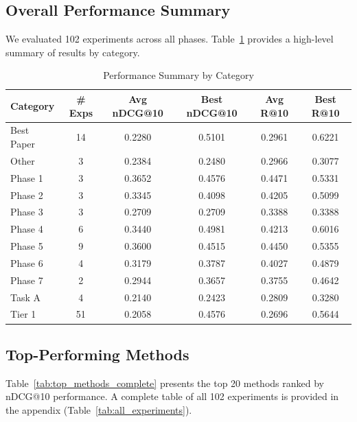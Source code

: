 \documentclass[11pt]{article}
\begin{document}
\subsection{Overall Performance Summary}

We evaluated 102 experiments across all phases. Table~\ref{tab:category_summary} provides a high-level summary of results by category.

\begin{table}[h]
\centering
\caption{Performance Summary by Category}
\label{tab:category_summary}
\small
\begin{tabular}{lccccc}
\toprule
\textbf{Category} & \textbf{\# Exps} & \textbf{Avg nDCG@10} & \textbf{Best nDCG@10} & \textbf{Avg R@10} & \textbf{Best R@10} \\
\midrule
Best Paper & 14 & 0.2280 & 0.5101 & 0.2961 & 0.6221 \\
Other & 3 & 0.2384 & 0.2480 & 0.2966 & 0.3077 \\
Phase 1 & 3 & 0.3652 & 0.4576 & 0.4471 & 0.5331 \\
Phase 2 & 3 & 0.3345 & 0.4098 & 0.4205 & 0.5099 \\
Phase 3 & 3 & 0.2709 & 0.2709 & 0.3388 & 0.3388 \\
Phase 4 & 6 & 0.3440 & 0.4981 & 0.4213 & 0.6016 \\
Phase 5 & 9 & 0.3600 & 0.4515 & 0.4450 & 0.5355 \\
Phase 6 & 4 & 0.3179 & 0.3787 & 0.4027 & 0.4879 \\
Phase 7 & 2 & 0.2944 & 0.3657 & 0.3755 & 0.4642 \\
Task A & 4 & 0.2140 & 0.2423 & 0.2809 & 0.3280 \\
Tier 1 & 51 & 0.2058 & 0.4576 & 0.2696 & 0.5644 \\
\bottomrule
\end{tabular}
\end{table}

\subsection{Top-Performing Methods}

Table~\ref{tab:top_methods_complete} presents the top 20 methods ranked by nDCG@10 performance. A complete table of all 102 experiments is provided in the appendix (Table~\ref{tab:all_experiments}).
\end{document}
